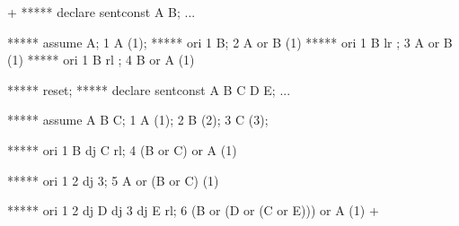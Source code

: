 \gfexample+
   ***** declare sentconst A B;
   ...

   ***** assume A;
   1  A  (1);
   ***** ori 1 B;
   2  A or B  (1)
   ***** ori 1 B lr ;
   3  A or B (1)
   ***** ori 1 B rl ;
   4  B or A  (1)

   ***** reset;
   ***** declare sentconst A B C D E;
   ...

   ***** assume A B C;
   1  A  (1);
   2  B  (2);
   3  C  (3);

   ***** ori 1 B dj C rl;
   4  (B or C) or A   (1)

   ***** ori 1 2 dj 3;
   5  A or (B or C)   (1)

   ***** ori 1 2 dj D dj 3 dj E rl;
   6  (B or (D or (C or E))) or A   (1)
+

